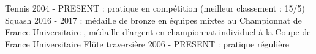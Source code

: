 

\begin{cvskills}

  \cvskill
    {Tennis} %
    {2004 - PRESENT : pratique en compétition (meilleur classement : 15/5)} 
  \cvskill
    {Squash} %
    {2016 - 2017 : médaille de bronze en équipes mixtes au Championnat de France Universitaire , médaille d'argent en championnat individuel à la Coupe de France Universitaire } 
  \cvskill
    {Flûte traversière} %
    {2006 - PRESENT : pratique régulière} 
\end{cvskills}
